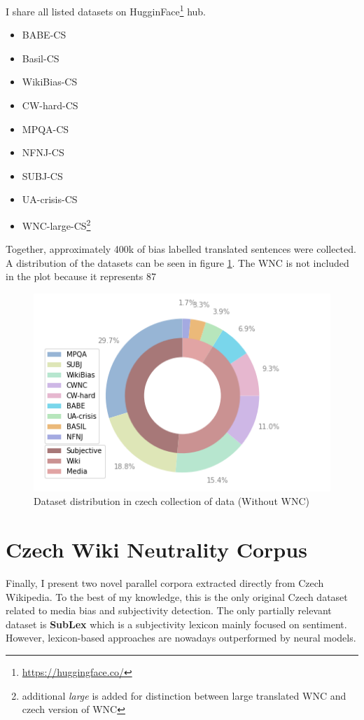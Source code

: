 I share all listed datasets on HugginFace\footnote{\url{https://huggingface.co/}} hub.

\begin{itemize}
    \item BABE-CS
    \item Basil-CS
    \item WikiBias-CS
    \item CW-hard-CS
    \item MPQA-CS
    \item NFNJ-CS
    \item SUBJ-CS
    \item UA-crisis-CS
    \item WNC-large-CS\footnote{additional \textit{large} is added for distinction between large translated WNC and czech version of WNC}
\end{itemize}

Together, approximately 400k of bias labelled translated sentences were collected. A distribution of the datasets can be seen in figure \ref{fig:cz_data}. The WNC is not included in the plot because it represents 87%


\begin{figure}
  \includegraphics[scale=0.5]{my_modules/multimedia/withoutWNC.png}
  \caption{Dataset distribution in czech collection of data (Without WNC)}
  \label{fig:cz_data}
\end{figure}




\section{Czech Wiki Neutrality Corpus}
Finally, I present two novel parallel corpora extracted directly from Czech Wikipedia. To the best of my knowledge, this is the only original Czech dataset related to media bias and subjectivity detection. The only partially relevant dataset is \textbf{SubLex}\cite{11858/00-097C-0000-0022-FF60-B} which is a subjectivity lexicon mainly focused on sentiment. However, lexicon-based approaches are nowadays outperformed by neural models.

